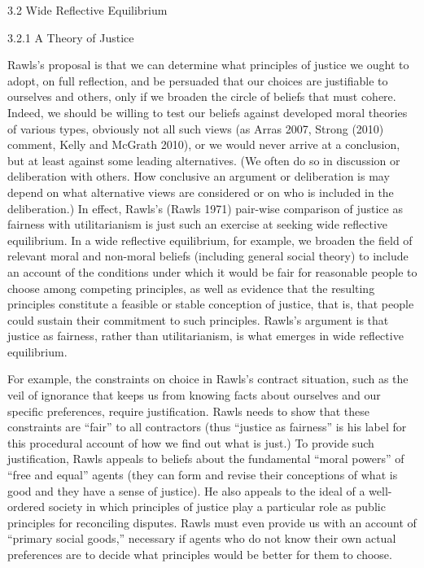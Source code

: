\documentclass[]{article}
\begin{document}
\protect\hypertarget{WidRefEqu}{}{3.2 Wide Reflective Equilibrium}

3.2.1 A Theory of Justice

Rawls's proposal is that we can determine what principles of justice we
ought to adopt, on full reflection, and be persuaded that our choices
are justifiable to ourselves and others, only if we broaden the circle
of beliefs that must cohere. Indeed, we should be willing to test our
beliefs against developed moral theories of various types, obviously not
all such views (as Arras 2007, Strong (2010) comment, Kelly and McGrath
2010), or we would never arrive at a conclusion, but at least against
some leading alternatives. (We often do so in discussion or deliberation
with others. How conclusive an argument or deliberation is may depend on
what alternative views are considered or on who is included in the
deliberation.) In effect, Rawls's (Rawls 1971) pair-wise comparison of
justice as fairness with utilitarianism is just such an exercise at
seeking wide reflective equilibrium. In a wide reflective equilibrium,
for example, we broaden the field of relevant moral and non-moral
beliefs (including general social theory) to include an account of the
conditions under which it would be fair for reasonable people to choose
among competing principles, as well as evidence that the resulting
principles constitute a feasible or stable conception of justice, that
is, that people could sustain their commitment to such principles.
Rawls's argument is that justice as fairness, rather than
utilitarianism, is what emerges in wide reflective equilibrium.

For example, the constraints on choice in Rawls's contract situation,
such as the veil of ignorance that keeps us from knowing facts about
ourselves and our specific preferences, require justification. Rawls
needs to show that these constraints are ``fair'' to all contractors
(thus ``justice as fairness'' is his label for this procedural account
of how we find out what is just.) To provide such justification, Rawls
appeals to beliefs about the fundamental ``moral powers'' of ``free and
equal'' agents (they can form and revise their conceptions of what is
good and they have a sense of justice). He also appeals to the ideal of
a well-ordered society in which principles of justice play a particular
role as public principles for reconciling disputes. Rawls must even
provide us with an account of ``primary social goods,'' necessary if
agents who do not know their own actual preferences are to decide what
principles would be better for them to choose.
\end{document}

